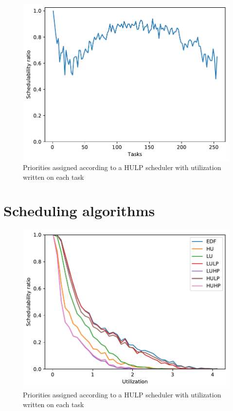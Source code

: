 \documentclass{kththesis}
\begin{document}
\begin{figure}[H]

    \centering

    \includegraphics[width=1.0\linewidth]{images/task_amount_1.pdf}

    \caption{Priorities assigned according to a HULP scheduler with utilization written on each task}

    \label{fig:task_amount_1}

\end{figure}


\section{Scheduling algorithms}

\begin{figure}[H]

    \centering

    \includegraphics[width=1.0\linewidth]{images/sched_algos.pdf}

    \caption{Priorities assigned according to a HULP scheduler with utilization written on each task}

    \label{fig:sched_algos}

\end{figure}
\end{document}

